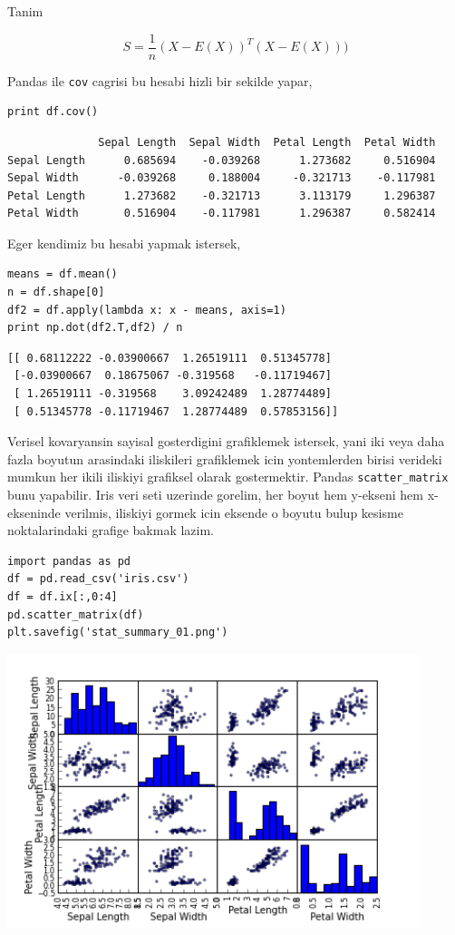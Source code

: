 \documentclass[12pt,fleqn]{article}\usepackage{../common}
\begin{document}
Tanim

$$ S = \frac{1}{n} (X-E(X))^T(X-E(X))) $$

Pandas ile \verb!cov! cagrisi bu hesabi hizli bir sekilde yapar,

\begin{verbatim}
print df.cov()
\end{verbatim}

\begin{verbatim}
              Sepal Length  Sepal Width  Petal Length  Petal Width
Sepal Length      0.685694    -0.039268      1.273682     0.516904
Sepal Width      -0.039268     0.188004     -0.321713    -0.117981
Petal Length      1.273682    -0.321713      3.113179     1.296387
Petal Width       0.516904    -0.117981      1.296387     0.582414
\end{verbatim}

Eger kendimiz bu hesabi yapmak istersek,

\begin{verbatim}
means = df.mean()
n = df.shape[0]
df2 = df.apply(lambda x: x - means, axis=1)
print np.dot(df2.T,df2) / n
\end{verbatim}

\begin{verbatim}
[[ 0.68112222 -0.03900667  1.26519111  0.51345778]
 [-0.03900667  0.18675067 -0.319568   -0.11719467]
 [ 1.26519111 -0.319568    3.09242489  1.28774489]
 [ 0.51345778 -0.11719467  1.28774489  0.57853156]]
\end{verbatim}

Verisel kovaryansin sayisal gosterdigini grafiklemek istersek, yani iki
veya daha fazla boyutun arasindaki iliskileri grafiklemek icin yontemlerden
birisi verideki mumkun her ikili iliskiyi grafiksel olarak
gostermektir. Pandas \verb!scatter_matrix! bunu yapabilir. Iris veri seti
uzerinde gorelim, her boyut hem y-ekseni hem x-ekseninde verilmis, iliskiyi
gormek icin eksende o boyutu bulup kesisme noktalarindaki grafige bakmak
lazim.

\begin{verbatim}
import pandas as pd
df = pd.read_csv('iris.csv')
df = df.ix[:,0:4]
pd.scatter_matrix(df)
plt.savefig('stat_summary_01.png')
\end{verbatim}

\includegraphics[height=8cm]{stat_cov_corr_01.png}
\end{document}
